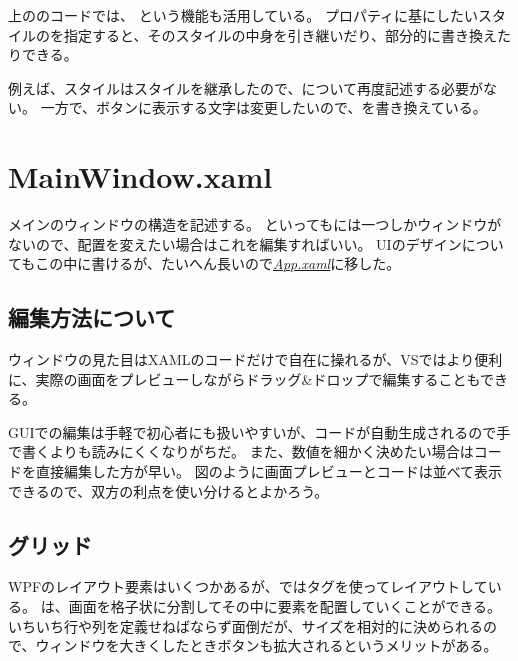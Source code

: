 \documentclass[letterpaper,10pt,dvipdfmx]{sphinxmanual}
\begin{document}
上ののコードでは、 という機能も活用している。
プロパティに基にしたいスタイルのを指定すると、そのスタイルの中身を引き継いだり、部分的に書き換えたりできる。

例えば、スタイルはスタイルを継承したので、について再度記述する必要がない。
一方で、ボタンに表示する文字は変更したいので、を書き換えている。


\section{MainWindow.xaml}
\label{\detokenize{nissyu-idohen/pc-software-code:mainwindow-xaml}}
メインのウィンドウの構造を記述する。
といってもには一つしかウィンドウがないので、配置を変えたい場合はこれを編集すればいい。
UIのデザインについてもこの中に書けるが、たいへん長いので{\hyperref[\detokenize{nissyu-idohen/pc-software-code:app-xaml}]{\emph{App.xaml}}}に移した。


\subsection{編集方法について}
\label{\detokenize{nissyu-idohen/pc-software-code:}}\label{\detokenize{nissyu-idohen/pc-software-code:id6}}
ウィンドウの見た目はXAMLのコードだけで自在に操れるが、VSではより便利に、実際の画面をプレビューしながらドラッグ\&ドロップで編集することもできる。


GUIでの編集は手軽で初心者にも扱いやすいが、コードが自動生成されるので手で書くよりも読みにくくなりがちだ。
また、数値を細かく決めたい場合はコードを直接編集した方が早い。
図のように画面プレビューとコードは並べて表示できるので、双方の利点を使い分けるとよかろう。


\subsection{グリッド}
\label{\detokenize{nissyu-idohen/pc-software-code:}}\label{\detokenize{nissyu-idohen/pc-software-code:id7}}
WPFのレイアウト要素はいくつかあるが、ではタグを使ってレイアウトしている。
 は、画面を格子状に分割してその中に要素を配置していくことができる。
いちいち行や列を定義せねばならず面倒だが、サイズを相対的に決められるので、ウィンドウを大きくしたときボタンも拡大されるというメリットがある。
\end{document}
